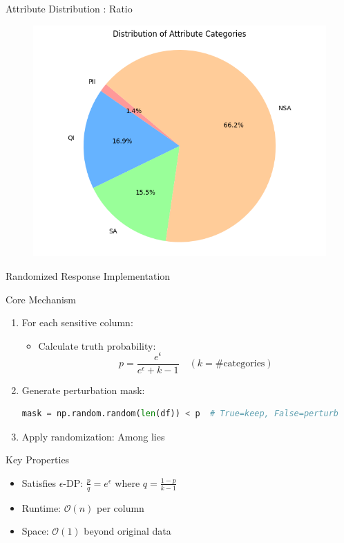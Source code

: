 \documentclass{beamer}
\begin{document}
\begin{frame}{Attribute Distribution : Ratio}
\begin{figure}
    \centering
    \includegraphics[width=1\textwidth]{slide_image/cat_dist.png}
\end{figure}
\end{frame}

\begin{frame}{Randomized Response Implementation}
\footnotesize

\begin{block}{Core Mechanism}
\begin{enumerate}
\item For each sensitive column:
\begin{itemize}
\item Calculate truth probability: 
\vspace{-0.5em}
\[ p = \frac{e^\epsilon}{e^\epsilon + k - 1} \quad (k=\text{\# categories}) \]
\end{itemize}

\item Generate perturbation mask:
\begin{lstlisting}[language=Python]
mask = np.random.random(len(df)) < p  # True=keep, False=perturb
\end{lstlisting}

\item Apply randomization: Among lies
\end{enumerate}
\end{block}

\begin{exampleblock}{Key Properties}
\begin{itemize}
\item Satisfies $\epsilon$-DP: $\frac{p}{q} = e^\epsilon$ where $q=\frac{1-p}{k-1}$
\item Runtime: $\mathcal{O}(n)$ per column
\item Space: $\mathcal{O}(1)$ beyond original data
\end{itemize}
\end{exampleblock}
\end{frame}
\end{document}

